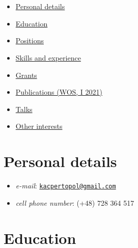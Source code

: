\documentclass{article}
\providecommand{\tightlist}{%
  \setlength{\itemsep}{0pt}\setlength{\parskip}{0pt}}
\begin{document}
\hypertarget{section}{%
\section{}\label{section}}

\begin{itemize}
\tightlist
\item
  \protect\hyperlink{personal-details}{Personal details}
\item
  \protect\hyperlink{education}{Education}
\item
  \protect\hyperlink{positions}{Positions}
\item
  \protect\hyperlink{skills-and-experience}{Skills and experience}
\item
  \protect\hyperlink{grants}{Grants}
\item
  \href{./0pl.html}{Publications (WOS, I 2021)}
\item
  \href{./00pl.html}{Talks}
\item
  \protect\hyperlink{other-interests}{Other interests}
\end{itemize}

\hypertarget{personal-details}{%
\section{Personal details}\label{personal-details}}

\begin{itemize}
\tightlist
\item
  \emph{e-mail}:
  \href{mailto:kacpertopol@gmail.com}{\nolinkurl{kacpertopol@gmail.com}}
\item
  \emph{cell phone number}: (+48) 728 364 517
\end{itemize}

\hypertarget{education}{%
\section{Education}\label{education}}
\end{document}
